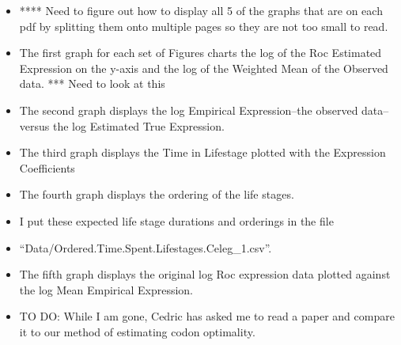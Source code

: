 \documentclass[letterpaper,index=totoc,hyperref,openany]{labbook} %
\begin{document}
\begin{itemize}
\item **** Need to figure out how to display all 5 of the graphs that are on each pdf by splitting them onto multiple pages so they are not too small to read.
\item The first graph for each set of Figures charts the log of the Roc Estimated Expression on the y-axis and the log of the Weighted Mean of the Observed data. *** Need to look at this
\item The second graph displays the log Empirical Expression--the observed data-- versus the log Estimated True Expression.
\item The third graph displays the Time in Lifestage plotted with the Expression Coefficients
\item The fourth graph displays the ordering of the life stages.
\item I put these expected life stage durations and orderings in the file
\item  \enquote{Data/Ordered.Time.Spent.Lifestages.Celeg\_1.csv}.
\item The fifth graph displays the original log Roc expression data plotted against the log Mean Empirical Expression.
\item TO DO: While I am gone, Cedric has asked me to read a paper and compare it to our method of estimating codon optimality.
\end{itemize}
\end{document}
